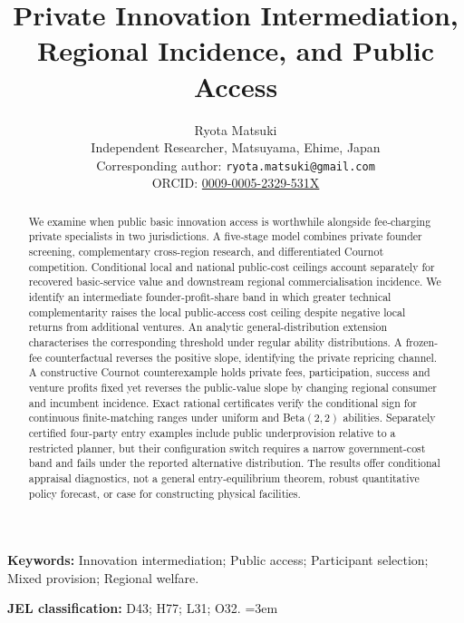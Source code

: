 \documentclass[11pt]{article}
\title{Private Innovation Intermediation,\\ Regional Incidence, and Public Access}
\author{Ryota Matsuki\\
{\small Independent Researcher, Matsuyama, Ehime, Japan}\\
{\small Corresponding author: \texttt{ryota.matsuki@gmail.com}}\\
{\small ORCID: \href{https://orcid.org/0009-0005-2329-531X}{0009-0005-2329-531X}}}
\date{}
\begin{document}
\maketitle
\begin{abstract}
We examine when public basic innovation access is worthwhile alongside
fee-charging private specialists in two jurisdictions. A five-stage model
combines private founder screening, complementary cross-region research,
and differentiated Cournot competition. Conditional local and national
public-cost ceilings account separately for recovered basic-service value
and downstream regional commercialisation incidence. We identify an
intermediate founder-profit-share band in which greater technical
complementarity raises the local public-access cost ceiling despite
negative local returns from additional ventures. An analytic
general-distribution extension characterises the corresponding threshold
under regular ability distributions. A frozen-fee counterfactual reverses
the positive slope, identifying the private repricing channel. A
constructive Cournot counterexample holds private fees, participation,
success and venture profits fixed yet reverses the public-value slope by
changing regional consumer and incumbent incidence. Exact rational
certificates verify the conditional sign for continuous finite-matching
ranges under uniform and Beta$(2,2)$ abilities. Separately certified
four-party entry examples include public underprovision relative to a
restricted planner, but their configuration switch requires a narrow
government-cost band and fails under the reported alternative
distribution. The results offer conditional appraisal diagnostics, not a
general entry-equilibrium theorem, robust quantitative policy forecast,
or case for constructing physical facilities.
\end{abstract}
\noindent\textbf{Keywords:} Innovation intermediation; Public access; Participant selection; Mixed provision; Regional welfare.

\noindent\textbf{JEL classification:} D43; H77; L31; O32.
\doublespacing
\emergencystretch=3em %












\begingroup\raggedright\singlespacing{}


\endgroup
\end{document}
